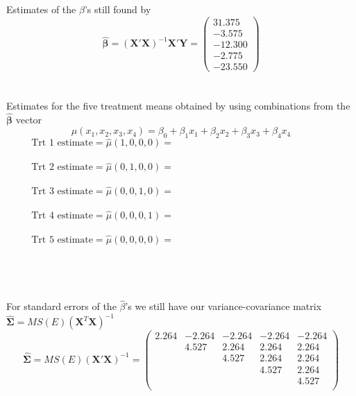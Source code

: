 \newpage

Estimates of the $\beta$'s still found by 
\[\hat{\boldsymbol{\beta}}= (\textbf{X}'\textbf{X})^{-1}\textbf{X}'\textbf{Y} = \left(\begin{array}{r} 31.375 \\ -3.575 \\ -12.300 \\
-2.775 \\ -23.550 \end{array} \right)
\]
~\\~\\

Estimates for the five treatment means obtained by using combinations from the $\hat{\boldsymbol{\beta}}$ vector 
$$\mu(x_1,x_2,x_3,x_4)=\beta_0 + \beta_1 x_1 + \beta_2 x_2 + \beta_3 x_3 + \beta_4 x_4$$
$$\mbox{Trt 1 estimate} = \hat\mu(1,0,0,0) = ~~~~~~~~~~~~~~~~~~~~~~~~~~~~~~~~~~~~~~~~~~~~~~~~~~~~~~~~~~~~~~~~~~~~~~~~~$$~\\
$$\mbox{Trt 2 estimate} = \hat\mu(0,1,0,0) = ~~~~~~~~~~~~~~~~~~~~~~~~~~~~~~~~~~~~~~~~~~~~~~~~~~~~~~~~~~~~~~~~~~~~~~~~~$$~\\
$$\mbox{Trt 3 estimate} = \hat\mu(0,0,1,0) = ~~~~~~~~~~~~~~~~~~~~~~~~~~~~~~~~~~~~~~~~~~~~~~~~~~~~~~~~~~~~~~~~~~~~~~~~~$$~\\
$$\mbox{Trt 4 estimate} = \hat\mu(0,0,0,1) = ~~~~~~~~~~~~~~~~~~~~~~~~~~~~~~~~~~~~~~~~~~~~~~~~~~~~~~~~~~~~~~~~~~~~~~~~~$$~\\
$$\mbox{Trt 5 estimate} = \hat\mu(0,0,0,0) = ~~~~~~~~~~~~~~~~~~~~~~~~~~~~~~~~~~~~~~~~~~~~~~~~~~~~~~~~~~~~~~~~~~~~~~~~~$$~\\
~\\~\\~\\

For standard errors of the $\hat{\beta}$'s we still have our variance-covariance matrix $\hat{\boldsymbol{\Sigma}}=MS(E)(\textbf{X}^{T}\textbf{X})^{-1}$
\[ 
\hat{\boldsymbol{\Sigma}} = MS(E) (\textbf{X}'\textbf{X})^{-1} = \left(\begin{array}{rrrrr} 
2.264   & -2.264      & -2.264      & -2.264      & -2.264 \\
      & 4.527       & 2.264      & 2.264       & 2.264 \\
      &           & 4.527       & 2.264       & 2.264 \\
      &           &           & 4.527      & 2.264 \\
      &           &           &           & 4.527 \\
\end{array} \right)
\]


